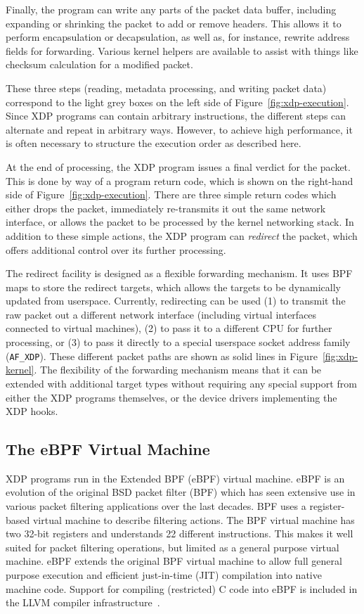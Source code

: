 \documentclass[sigconf]{acmart}
\begin{document}
Finally, the program can write any parts of the packet data buffer, including
expanding or shrinking the packet to add or remove headers. This allows it to
perform encapsulation or decapsulation, as well as, for instance, rewrite
address fields for forwarding. Various kernel helpers are available to assist
with things like checksum calculation for a modified packet.

These three steps (reading, metadata processing, and writing packet data)
correspond to the light grey boxes on the left side of
Figure~\ref{fig:xdp-execution}. Since XDP programs can contain arbitrary
instructions, the different steps can alternate and repeat in arbitrary ways.
However, to achieve high performance, it is often necessary to structure the
execution order as described here.

At the end of processing, the XDP program issues a final verdict for the packet.
This is done by way of a program return code, which is shown on the right-hand
side of Figure~\ref{fig:xdp-execution}. There are three simple return codes
which either drops the packet, immediately re-transmits it out the same network
interface, or allows the packet to be processed by the kernel networking stack.
In addition to these simple actions, the XDP program can \emph{redirect} the
packet, which offers additional control over its further processing.

The redirect facility is designed as a flexible forwarding mechanism. It uses
BPF maps to store the redirect targets, which allows the targets to be
dynamically updated from userspace. Currently, redirecting can be used (1) to
transmit the raw packet out a different network interface (including virtual
interfaces connected to virtual machines), (2) to pass it to a different CPU for
further processing, or (3) to pass it directly to a special userspace socket
address family (\texttt{AF\_XDP}). These different packet paths are shown as
solid lines in Figure~\ref{fig:xdp-kernel}. The flexibility of the forwarding
mechanism means that it can be extended with additional target types without
requiring any special support from either the XDP programs themselves, or the
device drivers implementing the XDP hooks.

\subsection{The eBPF Virtual Machine}
\label{sec:bpf-vm}
XDP programs run in the Extended BPF (eBPF) virtual machine. eBPF is an
evolution of the original BSD packet filter (BPF) \cite{mccanne_bsd_1993} which
has seen extensive use in various packet filtering applications over the last
decades. BPF uses a register-based virtual machine to describe filtering
actions. The BPF virtual machine has two 32-bit registers and understands 22
different instructions. This makes it well suited for packet filtering
operations, but limited as a general purpose virtual machine. eBPF extends the
original BPF virtual machine to allow full general purpose execution and
efficient just-in-time (JIT) compilation into native machine code. Support for
compiling (restricted) C code into eBPF is included in the LLVM compiler
infrastructure~\cite{llvm}.
\end{document}
